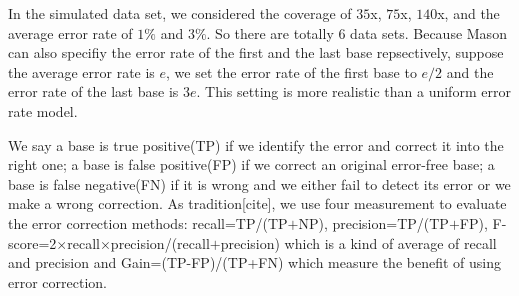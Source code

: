 \documentclass[10pt]{article}
\begin{document}
In the simulated data set, we considered the coverage of $35$x, $75$x, $140$x, and the average error rate of $1\%$ and $3\%$. So there are totally 6 data sets. Because Mason can also specifiy the error rate of the first and the last base repsectively, suppose the average error rate is $e$, we set the error rate of the first base to $e/2$ and the error rate of the last base is $3e$. This setting is more realistic than a uniform error rate model. 

We say a base is true positive(TP) if we identify the error and correct it into the right one; a base is false positive(FP) if we correct an original error-free base; a base is false negative(FN) if it is wrong and we either fail to detect its error or we make a wrong correction. As tradition[cite], we use four measurement to evaluate the error correction methods: recall=TP/(TP$+$NP), precision=TP/(TP$+$FP), F-score=2$\times$recall$\times$precision/(recall$+$precision) which is a kind of average of recall and precision and Gain=(TP-FP)/(TP+FN) which measure the benefit of using error correction.
\end{document}
